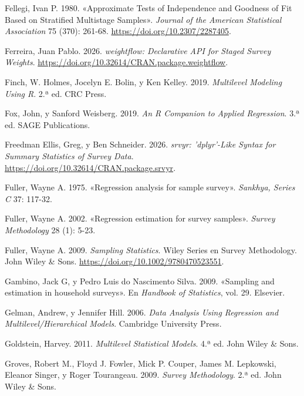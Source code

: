 \documentclass[
  spanish,
  11pt,
  letterpaper,
  oneside,
  open=any]{scrbook}
\newlength{\cslhangindent}
\newenvironment{CSLReferences}[2] %
 {\begin{list}{}{%
  \setlength{\itemindent}{0pt}
  \setlength{\leftmargin}{0pt}
  \setlength{\parsep}{0pt}
  \ifodd #1
   \setlength{\leftmargin}{\cslhangindent}
   \setlength{\itemindent}{-1\cslhangindent}
  \fi
  \setlength{\itemsep}{#2\baselineskip}}}
 {\end{list}}
\begin{document}
\begin{CSLReferences}{1}{1}
Fellegi, Ivan P. 1980. {«Approximate Tests of Independence and Goodness
of Fit Based on Stratified Multistage Samples»}. \emph{Journal of the
American Statistical Association} 75 (370): 261-68.
\url{https://doi.org/10.2307/2287405}.

Ferreira, Juan Pablo. 2026. \emph{weightflow: Declarative API for Staged
Survey Weights}. \url{https://doi.org/10.32614/CRAN.package.weightflow}.

Finch, W. Holmes, Jocelyn E. Bolin, y Ken Kelley. 2019. \emph{Multilevel
Modeling Using {R}}. 2.ª ed. CRC Press.

Fox, John, y Sanford Weisberg. 2019. \emph{An R Companion to Applied
Regression}. 3.ª ed. SAGE Publications.

Freedman Ellis, Greg, y Ben Schneider. 2026. \emph{srvyr: 'dplyr'-Like
Syntax for Summary Statistics of Survey Data}.
\url{https://doi.org/10.32614/CRAN.package.srvyr}.

Fuller, Wayne A. 1975. {«Regression analysis for sample survey»}.
\emph{Sankhya, Series C} 37: 117-32.

Fuller, Wayne A. 2002. {«Regression estimation for survey samples»}.
\emph{Survey Methodology} 28 (1): 5-23.

Fuller, Wayne A. 2009. \emph{Sampling Statistics}. Wiley Series en
Survey Methodology. John Wiley \& Sons.
\url{https://doi.org/10.1002/9780470523551}.

Gambino, Jack G, y Pedro Luis do Nascimento Silva. 2009. {«Sampling and
estimation in household surveys»}. En \emph{Handbook of Statistics},
vol. 29. Elsevier.

Gelman, Andrew, y Jennifer Hill. 2006. \emph{Data Analysis Using
Regression and Multilevel/Hierarchical Models}. Cambridge University
Press.

Goldstein, Harvey. 2011. \emph{Multilevel Statistical Models}. 4.ª ed.
John Wiley \& Sons.

Groves, Robert M., Floyd J. Fowler, Mick P. Couper, James M. Lepkowski,
Eleanor Singer, y Roger Tourangeau. 2009. \emph{Survey Methodology}. 2.ª
ed. John Wiley \& Sons.


\end{CSLReferences}
\end{document}
